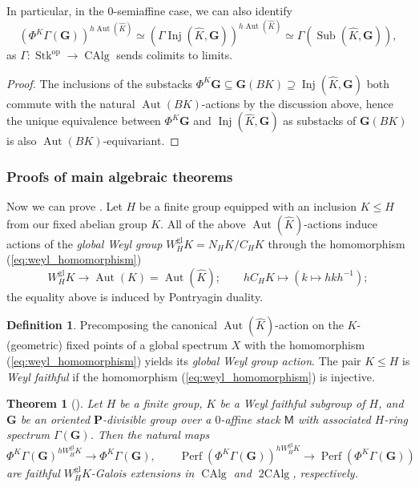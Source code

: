 \documentclass[11pt, a4paper]{article}
\newcommand{\gl}{\mathrm{gl}}
\newcommand{\1}{\mathbf{1}}
\DeclareMathOperator{\CAlg}{CAlg}
\DeclareMathOperator{\tworing}{2CAlg}
\DeclareMathOperator{\Inj}{Inj}
\DeclareMathOperator{\Sub}{Sub}
\DeclareMathOperator{\Perf}{Perf}
\DeclareMathOperator{\Stk}{Stk}
\DeclareMathOperator{\Aut}{Aut}
\newcommand{\op}{\mathrm{op}}
\newcommand{\dual}[1]{{\widehat{#1}}}
\newcommand{\G}{\mathbf{G}}
\newcommand{\M}{\mathsf{M}}
\renewcommand{\P}{\mathbf{P}}
\newcommand{\Ga}{\Gamma}
\theoremstyle{plain}
\newtheorem{theorem}[equation]{Theorem}\numberwithin{equation}{section}
\theoremstyle{definition}
\newtheorem{mydef}[equation]{Definition}
\theoremstyle{remark}\numberwithin{equation}{section}
\begin{document}
In particular, in the 0-semiaffine case, we can also identify
\begin{equation}\label{eq:geometric_model_for_fixedpoints}
  (\Phi^K \Ga(\G))^{h\Aut(\dual{K})} \simeq (\Ga \Inj(\dual{K}, \G))^{h\Aut(\dual{K})} \simeq \Ga(\Sub(\dual{K}, \G)),
\end{equation}
as $\Ga \colon \Stk^\op \to \CAlg$ sends colimits to limits.

\begin{proof}
    The inclusions of the substacks $\Phi^K \G \subseteq \G(BK) \supseteq \Inj(\dual{K}, \G)$ both commute with the natural $\Aut(BK)$-actions by the discussion above, hence the unique equivalence between $\Phi^K \G$ and $\Inj(\dual{K}, \G)$ as substacks of $\G(BK)$ is also $\Aut(BK)$-equivariant.
\end{proof}

\subsubsection{Proofs of main algebraic theorems}
Now we can prove . Let $H$ be a finite group equipped with an inclusion $K\leq H$ from our fixed abelian group $K$. All of the above $\Aut(\dual{K})$-actions induce actions of the \emph{global Weyl group} $W_H^\gl K = N_H K / C_H K$ through the homomorphism (\ref{eq:weyl_homomorphism})
\[W_H^\gl K \to \Aut(K) = \Aut(\dual{K}); \qquad hC_H K \mapsto (k\mapsto hkh^{-1});\]
the equality above is induced by Pontryagin duality.

\begin{mydef}\label{df:global_weyl_action}
    Precomposing the canonical $\Aut(\dual{K})$-action on the $K$- (geometric) fixed points of a global spectrum $X$ with the homomorphism (\ref{eq:weyl_homomorphism}) yields its \emph{global Weyl group action}. The pair $K\leq H$ is \emph{Weyl faithful} if the homomorphism (\ref{eq:weyl_homomorphism}) is injective.
\end{mydef}

\begin{theorem}[{}]\label{thm:algebraic_intext}
    Let $H$ be a finite group, $K$ be a Weyl faithful subgroup of $H$, and $\G$ be an oriented $\P$-divisible group over a $0$-affine stack $\M$ with associated $H$-ring spectrum $\Ga(\G)$. Then the natural maps
    \[\Phi^K \Ga(\G)^{hW_H^\gl K} \to \Phi^K \Ga(\G), \qquad \Perf(\Phi^K \Ga(\G))^{hW_H^\gl K} \to \Perf(\Phi^K \Ga(\G))\]
    are faithful $W_H^\gl K$-Galois extensions in $\CAlg$ and $\tworing$, respectively.
\end{theorem}
\end{document}
